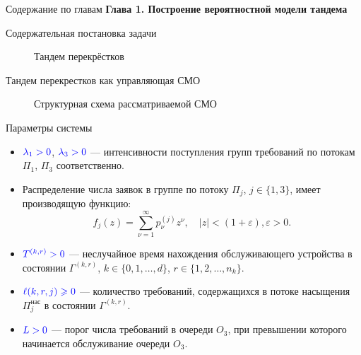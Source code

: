 \documentclass[10pt]{beamer}
\begin{document}
  \begin{frame}{Содержание по главам}
  \Large{\textbf{Глава 1. Построение вероятностной модели тандема}}\par


      \end{frame}
  
\begin{frame}{Содержательная постановка задачи}
        \begin{figure}[h]
    \centering
    \caption{Тандем перекрёстков}
    \label{VK:fig:1}
  \end{figure}
\end{frame}
























\begin{frame}{Тандем перекрестков как управляющая СМО}
  \begin{figure}[h]
    \centering
    \caption{Структурная схема рассматриваемой СМО}
    \label{VK:fig:2}
  \end{figure}
\end{frame} 


\begin{frame}{Параметры системы}
\begin{itemize}
    \item 
$\color{blue}\lambda_1>0$, $\color{blue}\lambda_3>0$ --- интенсивности поступления групп требований по потокам  $\Pi_1$, $\Pi_3$ соответственно.
  \item 
{\color{blue}Распределение числа заявок в группе} по потоку $\Pi_j$, $j \in \{1,3\}$, имеет производящую функцию:
$$
f_j(z) = \sum_{\nu=1}^{\infty} p_{\nu}^{(j)} z ^{\nu}, \quad |z|<(1+\varepsilon), \varepsilon>0.
$$
  \item 
$\color{blue}T^{(k,r)}>0$ --- неслучайное время нахождения обслуживающего устройства в состоянии $\Gamma^{(k,r)}$, $k\in \{0, 1, \ldots, d\}$, $r \in \{1, 2, \ldots, n_k\}$.  
  \item 
$\color{blue}\ell(k,r,j)\geqslant 0$ --- количество требований, содержащихся в потоке насыщения $\Pi^{\text{нас}}_j$ в состоянии  $\Gamma^{(k,r)}$.
  \item 
$\color{blue}L > 0$ --- порог числа требований в очереди $O_3$, при превышении которого начинается обслуживание очереди $O_3$.
\end{itemize}

\end{frame}
\end{document}
